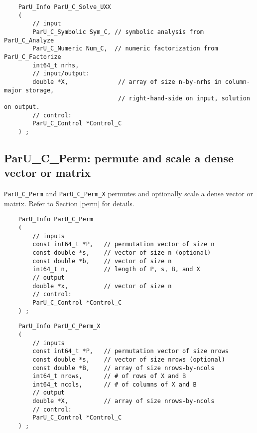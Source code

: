 \documentclass[12pt]{article}
\begin{document}
    {\footnotesize
    \begin{verbatim}
    ParU_Info ParU_C_Solve_UXX
    (
        // input
        ParU_C_Symbolic Sym_C, // symbolic analysis from ParU_C_Analyze
        ParU_C_Numeric Num_C,  // numeric factorization from ParU_C_Factorize
        int64_t nrhs,
        // input/output:
        double *X,              // array of size n-by-nrhs in column-major storage,
                                // right-hand-side on input, solution on output.
        // control:
        ParU_C_Control *Control_C
    ) ; \end{verbatim} }

\subsection{{\sf ParU\_C\_Perm}: permute and scale a dense vector or matrix}

    \verb'ParU_C_Perm' and \verb'ParU_C_Perm_X' permutes and optionally scale a
    dense vector or matrix.  Refer to Section \ref{perm} for details.

    {\footnotesize
    \begin{verbatim}
    ParU_Info ParU_C_Perm
    (
        // inputs
        const int64_t *P,   // permutation vector of size n
        const double *s,    // vector of size n (optional)
        const double *b,    // vector of size n
        int64_t n,          // length of P, s, B, and X
        // output
        double *x,          // vector of size n
        // control:
        ParU_C_Control *Control_C
    ) ; \end{verbatim} }

    {\footnotesize
    \begin{verbatim}
    ParU_Info ParU_C_Perm_X
    (
        // inputs
        const int64_t *P,   // permutation vector of size nrows
        const double *s,    // vector of size nrows (optional)
        const double *B,    // array of size nrows-by-ncols
        int64_t nrows,      // # of rows of X and B
        int64_t ncols,      // # of columns of X and B
        // output
        double *X,          // array of size nrows-by-ncols
        // control:
        ParU_C_Control *Control_C
    ) ; \end{verbatim} }

\end{document}
